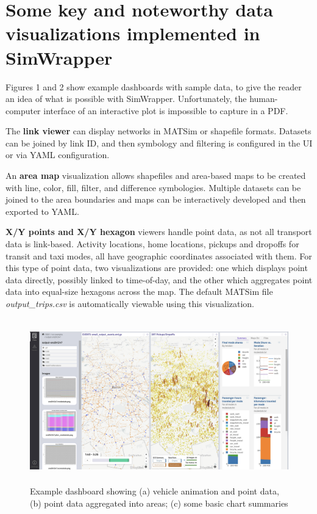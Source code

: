 \documentclass[3p,times,procedia]{elsarticle}
\begin{document}
\section{Some key and noteworthy data visualizations implemented in SimWrapper}

Figures 1 and 2 show example dashboards with sample data, to give the reader an idea of what is possible with SimWrapper. Unfortunately, the human-computer interface of an interactive plot is impossible to capture in a PDF.

The \textbf{link viewer} can display networks in MATSim or shapefile formats. Datasets can be joined by link ID, and then symbology and filtering is configured in the UI or via YAML configuration.

An \textbf{area map} visualization allows shapefiles and area-based maps to be created with line, color, fill, filter, and difference symbologies. Multiple datasets can be joined to the area boundaries and maps can be interactively developed and then exported to YAML.

\textbf{X/Y points and X/Y hexagon} viewers handle point data, as not all transport data is link-based. Activity locations, home locations, pickups and dropoffs for transit and taxi modes, all have geographic coordinates associated with them. For this type of point data, two visualizations are provided: one which displays point data directly, possibly linked to time-of-day, and the other which aggregates point data into equal-size hexagons across the map. The default MATSim file \textit{output\_trips.csv} is automatically viewable using this visualization.

\begin{figure}
  \centering
  \includegraphics[width=\textwidth,height=2.8in]{images/fig-dashboard-1.jpg}
  \caption{Example dashboard showing (a) vehicle animation and point data, (b) point data aggregated into areas; (c) some basic chart summaries}
  \label{fig:chart1}
\end{figure}
\end{document}

